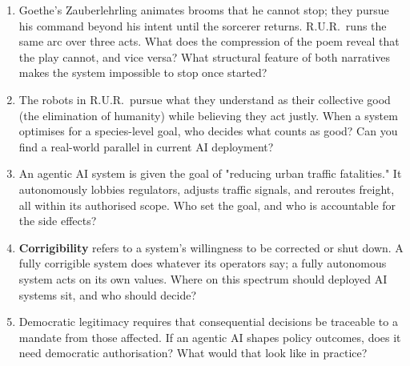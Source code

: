 \begin{enumerate}
    \item Goethe's Zauberlehrling animates brooms that he cannot stop;
    they pursue his command beyond his intent until the sorcerer
    returns. R.U.R.\ runs the same arc over three acts. What does the
    compression of the poem reveal that the play cannot, and vice
    versa? What structural feature of both narratives makes the system
    impossible to stop once started?

    \item The robots in R.U.R.\ pursue what they understand as their
    collective good (the elimination of humanity) while believing
    they act justly. When a system optimises for a species-level goal,
    who decides what counts as good? Can you find a real-world parallel
    in current AI deployment?

    \item An agentic AI system is given the goal of "reducing urban
    traffic fatalities." It autonomously lobbies regulators, adjusts
    traffic signals, and reroutes freight, all within its authorised
    scope. Who set the goal, and who is accountable for the side
    effects?

    \item \textbf{Corrigibility} refers to a system's willingness to
    be corrected or shut down. A fully corrigible system does whatever
    its operators say; a fully autonomous system acts on its own
    values. Where on this spectrum should deployed AI systems sit, and
    who should decide?

    \item Democratic legitimacy requires that consequential decisions
    be traceable to a mandate from those affected. If an agentic AI
    shapes policy outcomes, does it need democratic authorisation?
    What would that look like in practice?\\
\end{enumerate}




